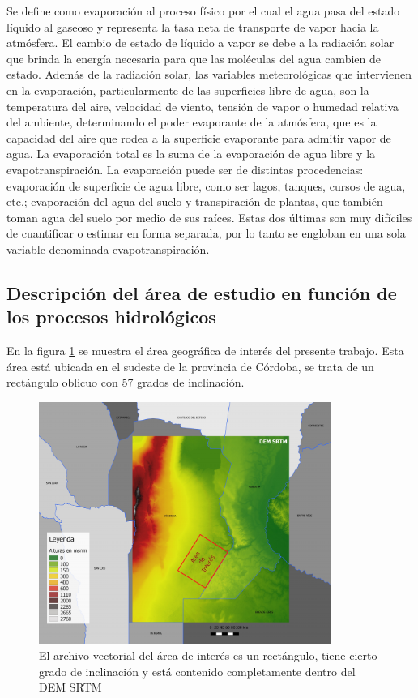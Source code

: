 \documentclass[10pt,a4paper, twoside]{report}
\begin{document}
Se define como evaporación al proceso físico por el cual el agua pasa del estado líquido al gaseoso y representa la tasa neta de transporte de vapor hacia la atmósfera. El cambio de estado de líquido a vapor se debe a la radiación solar que brinda la energía necesaria para que las moléculas del agua cambien de estado. Además de la radiación solar, las variables meteorológicas que intervienen en la evaporación, particularmente de las superficies libre de agua, son la temperatura del aire, velocidad de viento, tensión de vapor o humedad relativa del ambiente, determinando el poder evaporante de la atmósfera, que es la capacidad del aire que rodea a la superficie evaporante para admitir vapor de agua. La evaporación total es la suma de la evaporación de agua libre y la evapotranspiración. La evaporación puede ser de distintas procedencias: evaporación de superficie de agua libre, como ser lagos, tanques, cursos de agua, etc.; evaporación del agua del suelo y transpiración de plantas, que también toman agua del suelo por medio de sus raíces. Estas dos últimas son muy difíciles de cuantificar o estimar en forma separada, por lo tanto se engloban en una sola variable denominada evapotranspiración.

\subsection{Descripción del área de estudio en función de los procesos hidrológicos}
\label{subsec:introModelo}

En la figura \ref{SRTMAndShape} se muestra el área geográfica de interés del presente trabajo. Esta área está ubicada en el sudeste de la provincia de Córdoba, se trata de un rectángulo oblicuo con 57 grados de inclinación.

\begin{figure}[!htb]
   \centering      
   \includegraphics[width=0.85\textwidth]{imagenes/SRTMOriginalAndShape4.pdf}
 \caption{El archivo vectorial del área de interés es un rectángulo, tiene cierto grado de inclinación y está contenido completamente dentro del DEM SRTM}
 \label{SRTMAndShape}
\end{figure}
\end{document}
